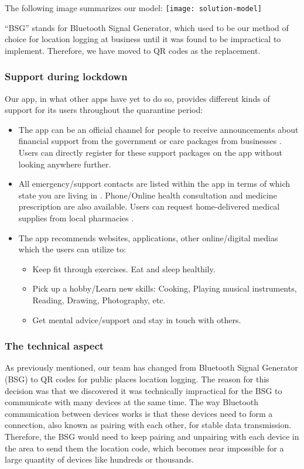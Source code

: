   \par The following image summarizes our model:
  \texttt{[image: solution-model]}
  \par ``BSG'' stands for Bluetooth Signal Generator, which used to be our method of choice for location logging at business until it was found to be impractical to implement. Therefore, we have moved to QR codes as the replacement.

  \subsubsection{Support during lockdown}
  \par Our app, in what other apps have yet to do so, provides different kinds of support for its users throughout the quarantine period:
  \begin{itemize}
    \item The app can be an official channel for people to receive announcements about financial support from the government \parencite{Support5} or care packages from businesses \parencite{Support1}. Users can directly register for these support packages on the app without looking anywhere further.
    \item All emergency/support contacts are listed within the app in terms of which state you are living in \parencite{Support1} \parencite{Support2} \parencite{Support4}. Phone/Online health consultation and medicine prescription are also available. Users can request home-delivered medical supplies from local pharmacies \parencite{Support2}.
    \item The app recommends websites, applications, other online/digital medias which the users can utilize to: \parencite{Support3} \parencite{Support4}
      \begin{itemize}
        \item Keep fit through exercises. Eat and sleep healthily.
        \item Pick up a hobby/Learn new skills: Cooking, Playing musical instruments, Reading, Drawing, Photography, etc.
        \item Get mental advice/support and stay in touch with others.
      \end{itemize} 
  \end{itemize}

  \subsubsection{The technical aspect}
  \par As previously mentioned, our team has changed from Bluetooth Signal Generator (BSG) to QR codes for public places location logging. The reason for this decision was that we discovered it was technically impractical for the BSG to communicate with many devices at the same time. The way Bluetooth communication between devices works is that these devices need to form a connection, also known as pairing with each other, for stable data transmission. Therefore, the BSG would need to keep pairing and unpairing with each device in the area to send them the location code, which becomes near impossible for a large quantity of devices like hundreds or thousands.

